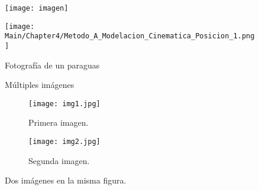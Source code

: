 
\begin{figure}
\texttt{[image: imagen]}
\end{figure}

\begin{figure}[htb]
   \centering
    \texttt{[image: Main/Chapter4/Metodo\_A\_Modelacion\_Cinematica\_Posicion\_1.png]}
    \caption{Fotografía de un paraguas}
\end{figure}

\usepackage{subfig}
\begin{figure}
 \centering
 \caption{Múltiples imágenes}
\end{figure}

\begin{figure}[!tbp]
  \begin{subfigure}[b]{0.49\textwidth}
    \texttt{[image: img1.jpg]}
    \caption{Primera imagen.}
    \label{fig:f1}
  \end{subfigure}
  \hfill
  \begin{subfigure}[b]{0.49\textwidth}
    \texttt{[image: img2.jpg]}
    \caption{Segunda imagen.}
    \label{fig:f2}
  \end{subfigure}
  \caption{Dos imágenes en la misma figura.}
\end{figure}
 

